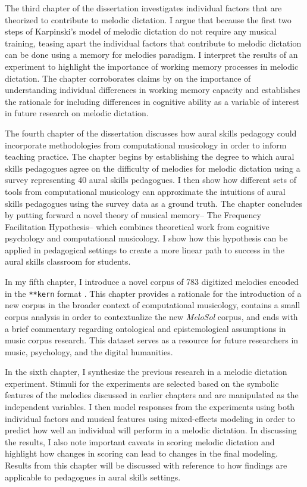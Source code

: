 \documentclass[12pt,]{book}
\begin{document}
The third chapter of the dissertation investigates individual factors that are theorized to contribute to melodic dictation.
I argue that because the first two steps of Karpinski's model of melodic dictation do not require any musical training, teasing apart the individual factors that contribute to melodic dictation can be done using a memory for melodies paradigm.
I interpret the results of an experiment to highlight the importance of working memory processes in melodic dictation.
The chapter corroborates claims by \citet{berzWorkingMemoryMusic1995} on the importance of understanding individual differences in working memory capacity and establishes the rationale for including differences in cognitive ability as a variable of interest in future research on melodic dictation.

The fourth chapter of the dissertation discusses how aural skills pedagogy could incorporate methodologies from computational musicology in order to inform teaching practice.
The chapter begins by establishing the degree to which aural skills pedagogues agree on the difficulty of melodies for melodic dictation using a survey representing 40 aural skills pedagogues.
I then show how different sets of tools from computational musicology can approximate the intuitions of aural skills pedagogues using the survey data as a ground truth.
The chapter concludes by putting forward a novel theory of musical memory-- The Frequency Facilitation Hypothesis-- which combines theoretical work from cognitive psychology and computational musicology.
I show how this hypothesis can be applied in pedagogical settings to create a more linear path to success in the aural skills classroom for students.

In my fifth chapter, I introduce a novel corpus of 783 digitized melodies encoded in the \texttt{**kern}
format \citep{huronHumdrumToolkitReference1994}.
This chapter provides a rationale for the introduction of a new corpus in the broader context of computational musicology, contains a small corpus analysis in order to contextualize the new \emph{MeloSol} corpus, and ends with a brief commentary regarding ontological and epistemological assumptions in music corpus research.
This dataset serves as a resource for future researchers in music, psychology, and the digital humanities.

In the sixth chapter, I synthesize the previous research in a melodic dictation experiment.
Stimuli for the experiments are selected based on the symbolic features of the melodies discussed in earlier chapters and are manipulated as the independent variables.
I then model responses from the experiments using both individual factors and musical features using mixed-effects modeling in order to predict how well an individual will perform in a melodic dictation.
In discussing the results, I also note important caveats in scoring melodic dictation and highlight how changes in scoring can lead to changes in the final modeling.
Results from this chapter will be discussed with reference to how findings are applicable to pedagogues in aural skills settings.
\end{document}
